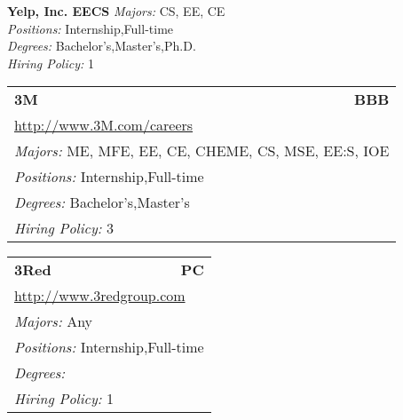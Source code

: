 \documentclass[twoside]{article}
\begin{document}
\begin{center}
\begin{multicols}{2}
\begin{minipage}{.95\columnwidth}{\Large\bf Yelp, Inc. \hfill EECS}
    \emph{Majors:} CS, EE, CE\\
    \emph{Positions:} Internship,Full-time\\
    \emph{Degrees:} Bachelor's,Master's,Ph.D.\\
    \emph{Hiring Policy:} 1\\
\end{minipage}
 \end{multicols}\end{center}
    \startcompanysection
    \begin{center}\begin{multicols}{3}
    \begin{FlushLeft}
    \begin{minipage}{\columnwidth}\begin{tabularx}{.95\columnwidth}{Xr}
                 {\Large\bf 3M} & {\Large\bf BBB}\\
    \multicolumn{2}{p{.95\columnwidth}}{\url{http://www.3M.com/careers}}\\
    \multicolumn{2}{p{.95\columnwidth}}{\emph{Majors:} ME, MFE, EE, CE, CHEME, CS, MSE, EE:S, IOE}\\
    \multicolumn{2}{p{.95\columnwidth}}{\emph{Positions:} Internship,Full-time}\\
    \multicolumn{2}{p{.95\columnwidth}}{\emph{Degrees:} Bachelor's,Master's}\\
    \multicolumn{2}{p{.95\columnwidth}}{\emph{Hiring Policy:} 3}\\
    \end{tabularx}
    
\end{minipage}
 
\begin{minipage}{\columnwidth}\begin{tabularx}{.95\columnwidth}{Xr}
                 {\Large\bf 3Red} & {\Large\bf PC}\\
    \multicolumn{2}{p{.95\columnwidth}}{\url{http://www.3redgroup.com}}\\
    \multicolumn{2}{p{.95\columnwidth}}{\emph{Majors:} Any}\\
    \multicolumn{2}{p{.95\columnwidth}}{\emph{Positions:} Internship,Full-time}\\
    \multicolumn{2}{p{.95\columnwidth}}{\emph{Degrees:} }\\
    \multicolumn{2}{p{.95\columnwidth}}{\emph{Hiring Policy:} 1}\\
    \end{tabularx}
    

\end{minipage}
\end{FlushLeft}
\end{multicols}
\end{center}
\end{document}
